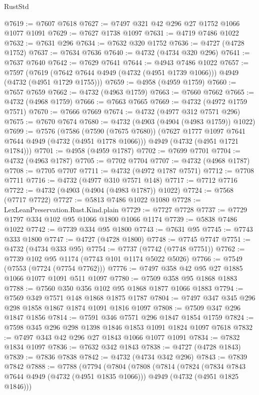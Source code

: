 \begin{lexlean}{RustStd}
\begin{coremodule}
@7619 := @7607 @7618
@7627 := @7497 @321 @42 @296 @27 @1752 @1066 @1077 @1091
@7629 := @7627 @1738 @1097
@7631 := @4719 @7486 @1022
@7632 := @7631 @296
@7634 := @7632 @320 @1752
@7636 := @4727 (@4728 @1752)
@7637 := @7634 @7636
@7640 := @4732 (@4734 @320 @296)
@7641 := @7637 @7640
@7642 := @7629 @7641
@7644 := @4943 @7486 @1022
@7657 := @7597
    (@7619 (@7642 @7644 @4949 (@4732 (@4951 @1739 @1066))) @4949 (@4732 (@4951 @1729 @1755)))
@7659 := @4958 (@4959 @1759)
@7660 := @7657 @7659
@7662 := @4732 (@4963 @1759)
@7663 := @7660 @7662
@7665 := @4732 (@4968 @1759)
@7666 := @7663 @7665
@7669 := @4732 (@4972 @1759 @7571)
@7670 := @7666 @7669
@7674 := @4732 (@4977 @312 @7571 @296)
@7675 := @7670 @7674
@7680 := @4732 (@4903 (@4904 (@4983 @1759)) @1022)
@7699 := @7576
    (@7586
      (@7590 (@7675 @7680))
      (@7627 @1777 @1097 @7641 @7644 @4949 (@4732 (@4951 @1778 @1066)))
      @4949
      (@4732 (@4951 @1721 @1784)))
@7701 := @4958 (@4959 @1787)
@7702 := @7699 @7701
@7704 := @4732 (@4963 @1787)
@7705 := @7702 @7704
@7707 := @4732 (@4968 @1787)
@7708 := @7705 @7707
@7711 := @4732 (@4972 @1787 @7571)
@7712 := @7708 @7711
@7716 := @4732 (@4977 @310 @7571 @148)
@7717 := @7712 @7716
@7722 := @4732 (@4903 (@4904 (@4983 @1787)) @1022)
@7724 := @7568 (@7717 @7722)
@7727 := @5813 @7486 @1022 @1080
@7728 := LexLeanPreservation.Rust.Kind.plain
@7729 := @7727 @7728
@7737 := @7729 @1797 @334 @102 @95 @1066 @1800 @1066 @1174
@7739 := @5838 @7486 @1022
@7742 := @7739 @334 @95 @1800
@7743 := @7631 @95
@7745 := @7743 @333 @1800
@7747 := @4727 (@4728 @1800)
@7748 := @7745 @7747
@7751 := @4732 (@4734 @333 @95)
@7754 := @7737 (@7742 (@7748 @7751))
@7762 := @7739 @102 @95 @1174 (@7743 @101 @1174 @5022 @5026)
@7766 := @7549 (@7553 (@7724 (@7754 @7762)))
@7776 := @7497 @358 @42 @95 @27 @1885 @1066 @1077 @1091 @511 @1097
@7780 := @7509 @358 @95 @1868 @1883
@7788 := @7560 @350 @356 @102 @95 @1868 @1877 @1066 @1883
@7794 := @7569 @349 @7571 @148 @1868 @1875 @1787
@7804 := @7497 @347 @345 @296 @298 @1858 @1867 @1874 @1091 @1816 @1097
@7808 := @7509 @347 @296 @1847 @1856
@7814 := @7591 @346 @7571 @296 @1847 @1854 @1759
@7824 := @7598 @345 @296 @298 @1398 @1846 @1853 @1091 @1824 @1097 @7618
@7832 := @7497 @343 @42 @296 @27 @1843 @1066 @1077 @1091
@7834 := @7832 @1834 @1097
@7836 := @7632 @342 @1843
@7838 := @4727 (@4728 @1843)
@7839 := @7836 @7838
@7842 := @4732 (@4734 @342 @296)
@7843 := @7839 @7842
@7888 := @7788
    (@7794
      (@7804
        (@7808
          (@7814
            (@7824
              (@7834 @7843 @7644 @4949 (@4732 (@4951 @1835 @1066)))
              @4949
              (@4732 (@4951 @1825 @1846)))

\end{coremodule}
\end{lexlean}
